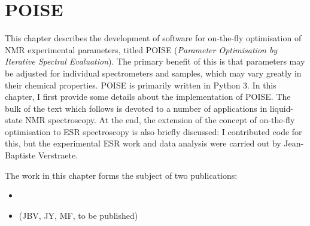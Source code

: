 \chapter{POISE}

This chapter describes the development of software for on-the-fly optimisation of NMR experimental parameters, titled POISE (\textit{Parameter Optimisation by Iterative Spectral Evaluation}).
The primary benefit of this is that parameters may be adjusted for individual spectrometers and samples, which may vary greatly in their chemical properties.
POISE is primarily written in Python 3.
In this chapter, I first provide some details about the implementation of POISE.
The bulk of the text which follows is devoted to a number of applications in liquid-state NMR spectroscopy.
At the end, the extension of the concept of on-the-fly optimisation to ESR spectroscopy is also briefly discussed: I contributed code for this, but the experimental ESR work and data analysis were carried out by Jean-Baptiste Verstraete.

The work in this chapter forms the subject of two publications:

\begin{itemize}
    \item {}
    \item (JBV, JY, MF, to be published)
\end{itemize}







\printbibliography[heading=subbibnumbered]{}
